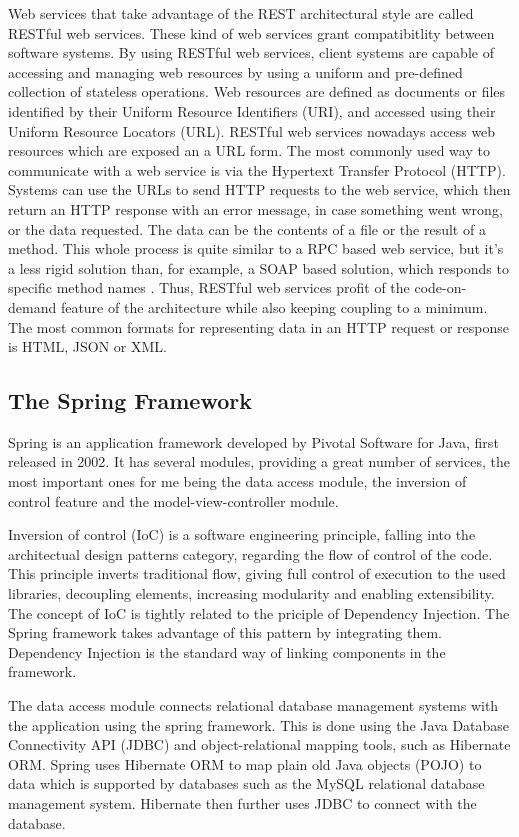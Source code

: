 \documentclass[12pt,a4paper,twoside]{report}
\begin{document}
Web services that take advantage of the REST architectural style are called RESTful web services. These kind of web services grant compatibitlity between software systems. By using RESTful web services, client systems are capable of accessing and managing web resources by using a uniform and pre-defined collection of stateless operations. Web resources are defined as documents or files identified by their Uniform Resource Identifiers (URI), and accessed using their Uniform Resource Locators (URL). RESTful web services nowadays access web resources which are exposed an a URL form. The most commonly used way to communicate with a web service is via the Hypertext Transfer Protocol (HTTP). Systems can use the URLs to send HTTP requests to the web service, which then return an HTTP response with an error message, in case something went wrong, or the data requested. The data can be the contents of a file or the result of a method. This whole process is quite similar to a RPC based web service, but it's a less rigid solution than, for example, a SOAP based solution, which responds to specific method names \cite{resftul_web_services}. Thus, RESTful web services profit of the code-on-demand feature of the architecture while also keeping coupling to a minimum. The most common formats for representing data in an HTTP request or response is HTML, JSON or XML.


\subsection{The Spring Framework}
Spring is an application framework developed by Pivotal Software for Java, first released in 2002. It has several modules, providing a great number of services, the most important ones for me being the data access module, the inversion of control feature and the model-view-controller module.

Inversion of control (IoC) is a software engineering principle, falling into the architectual design patterns category, regarding the flow of control of the code. This principle inverts traditional flow, giving full control of execution to the used libraries, decoupling elements, increasing modularity and enabling extensibility. The concept of IoC is tightly related to the priciple of Dependency Injection. The Spring framework takes advantage of this pattern by integrating them. Dependency Injection is the standard way of linking components in the framework.

The data access module connects relational database management systems with the application using the spring framework. This is done using the Java Database Connectivity API (JDBC) and object-relational mapping tools, such as Hibernate ORM. Spring uses Hibernate ORM to map plain old Java objects (POJO) to data which is supported by databases such as the MySQL relational database management system. Hibernate then further uses JDBC to connect with the database.
\end{document}
